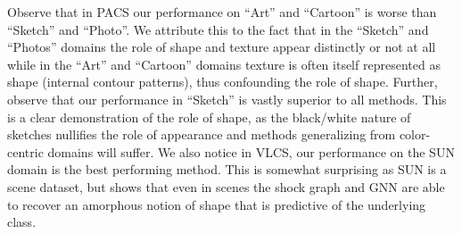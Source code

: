 Observe that in PACS our performance on ``Art'' and ``Cartoon'' is worse than ``Sketch'' and ``Photo''. We attribute this to the fact that in the ``Sketch'' and ``Photos'' domains the role of shape and texture appear distinctly or not at all while in the ``Art'' and ``Cartoon'' domains texture is often itself represented as shape (internal contour patterns), thus confounding the role of shape. Further, observe that our performance in ``Sketch'' is vastly superior to all methods. This is a clear demonstration of the role of shape, as the black/white nature of sketches nullifies the role of appearance and methods generalizing from color-centric domains will suffer. We also notice in VLCS,  our performance on the SUN domain is the best performing method. This is somewhat surprising as SUN is a scene dataset, but shows that even in scenes the shock graph and GNN are able to recover an amorphous notion of shape that is predictive of the underlying class. 


